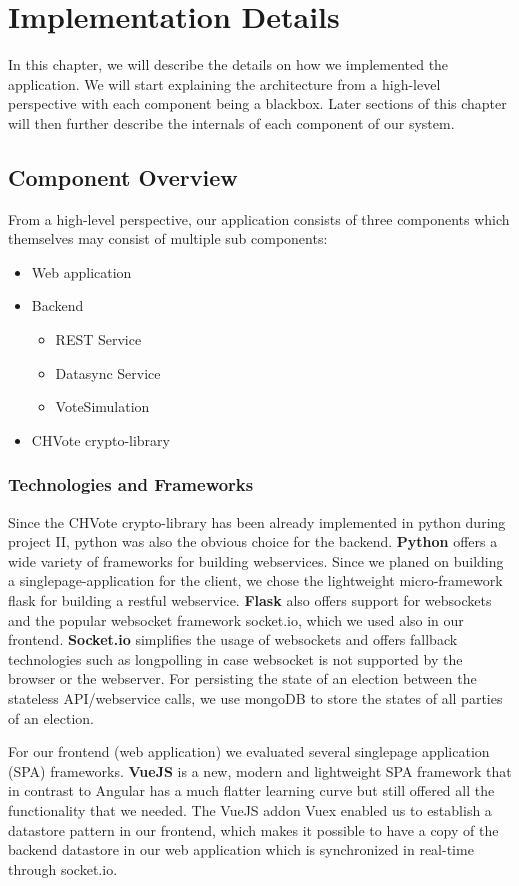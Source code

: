\chapter{Implementation Details}
In this chapter, we will describe the details on how we implemented the application. We will start explaining the architecture from a high-level perspective with each component being a blackbox. Later sections of this chapter will then further describe the internals of each component of our system.
\section{Component Overview}
From a high-level perspective, our application consists of three components which themselves may consist of multiple sub components:
\begin{itemize}
	\item Web application
	\item Backend
	\begin{itemize}
		\item REST Service
		\item Datasync Service
		\item VoteSimulation
	\end{itemize}
	\item CHVote crypto-library
\end{itemize}

\subsection{Technologies and Frameworks}
Since the CHVote crypto-library has been already implemented in python during project II, python was also the obvious choice for the backend. \textbf{Python} offers a wide variety of frameworks for building webservices. Since we planed on building a singlepage-application for the client, we chose the lightweight micro-framework flask for building a restful webservice. \textbf{Flask} also offers support for websockets and the popular websocket framework socket.io, which we used also in our frontend. \textbf{Socket.io} simplifies the usage of websockets and offers fallback technologies such as longpolling in case websocket is not supported by the browser or the webserver. For persisting the state of an election between the stateless API/webservice calls, we use mongoDB to store the states of all parties of an election.

For our frontend (web application) we evaluated several singlepage application (SPA) frameworks. \textbf{VueJS} is a new, modern and lightweight SPA framework that in contrast to Angular has a much flatter learning curve but still offered all the functionality that we needed. The VueJS addon Vuex enabled us to establish a datastore pattern in our frontend, which makes it possible to have a copy of the backend datastore in our web application which is synchronized in real-time through socket.io.

